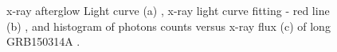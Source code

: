 \begin{figure}[hpbt]
\caption{x-ray  afterglow Light curve (a) , x-ray  light curve fitting - red line (b) , and histogram  of  photons counts  versus x-ray flux  (c)  of long GRB150314A .}
\end{figure}
